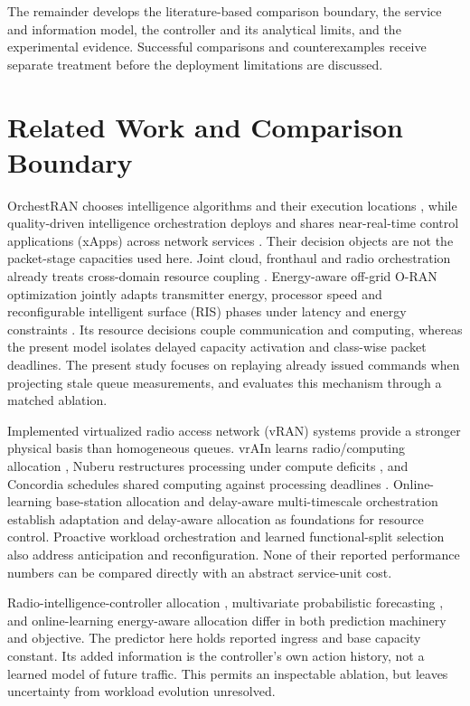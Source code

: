 \documentclass{IEEEoj}
\begin{document}
The remainder develops the literature-based comparison boundary, the service
and information model, the controller and its analytical limits, and the
experimental evidence. Successful comparisons and counterexamples receive
separate treatment before the deployment limitations are discussed.


\section{Related Work and Comparison Boundary}

OrchestRAN chooses intelligence algorithms and their execution locations
\cite{orchestr}, while quality-driven intelligence orchestration deploys and shares near-real-time control
applications (xApps) across network services \cite{oreo}. Their decision objects
are not the packet-stage capacities used here. Joint cloud, fronthaul and radio
orchestration already treats cross-domain resource coupling \cite{demir}.
Energy-aware off-grid O-RAN optimization jointly adapts transmitter energy, processor speed and reconfigurable intelligent surface (RIS) phases under latency and energy constraints \cite{alkarawi2025}. Its resource decisions couple communication and computing, whereas the present model isolates delayed capacity activation and class-wise packet deadlines. The present study focuses on replaying already issued commands when projecting stale queue measurements, and evaluates this mechanism through a matched ablation.

Implemented virtualized radio access network (vRAN) systems provide a stronger
physical basis than homogeneous queues. vrAIn learns radio/computing allocation
\cite{vrain}, Nuberu restructures processing under compute deficits
\cite{nuberu}, and Concordia schedules shared computing against processing
deadlines \cite{concordia}. Online-learning base-station allocation
\cite{kalntis} and delay-aware multi-timescale orchestration
\cite{marea} establish adaptation and delay-aware allocation as foundations for resource control. Proactive workload orchestration
\cite{caora} and learned functional-split selection \cite{murti} also address
anticipation and reconfiguration. None of their reported performance numbers
can be compared directly with an abstract service-unit cost.


Radio-intelligence-controller allocation \cite{wang}, multivariate
probabilistic forecasting \cite{kasuluru}, and online-learning energy-aware
allocation \cite{sora} differ in both prediction machinery and objective.
The predictor here holds reported ingress and base capacity constant. Its
added information is the controller's own action history, not a learned model
of future traffic. This permits an inspectable ablation, but leaves uncertainty
from workload evolution unresolved.
\end{document}
